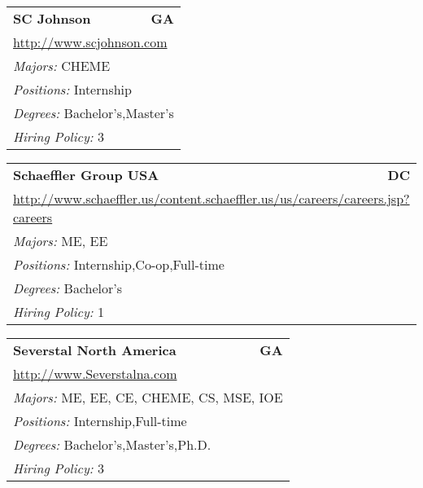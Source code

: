 \documentclass[twoside]{article}
\begin{document}
\begin{center}
\begin{multicols}{3}
\begin{FlushLeft}
\begin{minipage}{.9\columnwidth}
\end{minipage}
 
\begin{minipage}{.9\columnwidth}\begin{tabularx}{.95\columnwidth}{Xr}
                 {\Large\bf SC Johnson} & {\Large\bf GA}\\
    \multicolumn{2}{p{.95\columnwidth}}{\url{http://www.scjohnson.com}}\\
    \multicolumn{2}{p{.95\columnwidth}}{\emph{Majors:} CHEME}\\
    \multicolumn{2}{p{.95\columnwidth}}{\emph{Positions:} Internship}\\
    \multicolumn{2}{p{.95\columnwidth}}{\emph{Degrees:} Bachelor's,Master's}\\
    \multicolumn{2}{p{.95\columnwidth}}{\emph{Hiring Policy:} 3}\\
    \end{tabularx}
    
\end{minipage}
 
\begin{minipage}{.9\columnwidth}\begin{tabularx}{.95\columnwidth}{Xr}
                 {\Large\bf Schaeffler Group USA} & {\Large\bf DC}\\
    \multicolumn{2}{p{.95\columnwidth}}{\url{http://www.schaeffler.us/content.schaeffler.us/us/careers/careers.jsp?careers}}\\
    \multicolumn{2}{p{.95\columnwidth}}{\emph{Majors:} ME, EE}\\
    \multicolumn{2}{p{.95\columnwidth}}{\emph{Positions:} Internship,Co-op,Full-time}\\
    \multicolumn{2}{p{.95\columnwidth}}{\emph{Degrees:} Bachelor's}\\
    \multicolumn{2}{p{.95\columnwidth}}{\emph{Hiring Policy:} 1}\\
    \end{tabularx}
    
\end{minipage}
 
\begin{minipage}{.9\columnwidth}\begin{tabularx}{.95\columnwidth}{Xr}
                 {\Large\bf Severstal North America} & {\Large\bf GA}\\
    \multicolumn{2}{p{.95\columnwidth}}{\url{http://www.Severstalna.com}}\\
    \multicolumn{2}{p{.95\columnwidth}}{\emph{Majors:} ME, EE, CE, CHEME, CS, MSE, IOE}\\
    \multicolumn{2}{p{.95\columnwidth}}{\emph{Positions:} Internship,Full-time}\\
    \multicolumn{2}{p{.95\columnwidth}}{\emph{Degrees:} Bachelor's,Master's,Ph.D.}\\
    \multicolumn{2}{p{.95\columnwidth}}{\emph{Hiring Policy:} 3}\\
    \end{tabularx}
    

\end{minipage}
\end{FlushLeft}
\end{multicols}
\end{center}
\end{document}
